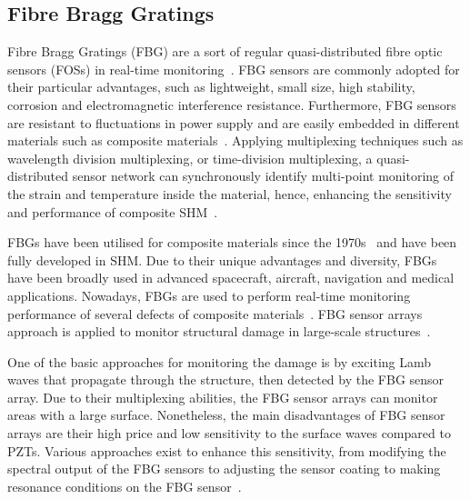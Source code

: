 \subsection{Fibre Bragg Gratings} 
Fibre Bragg Gratings (FBG) are a sort of regular quasi-distributed fibre optic sensors (FOSs) in real-time monitoring~\cite{Cai2012}.  
FBG sensors are commonly adopted for their particular advantages, such as lightweight, small size, high stability, corrosion and electromagnetic interference resistance. 
Furthermore, FBG sensors are resistant to fluctuations in power supply and are easily embedded in different materials such as composite materials~\cite{Jang2012}. 
Applying multiplexing techniques such as wavelength division multiplexing, or time-division multiplexing, a quasi-distributed sensor network can synchronously identify multi-point monitoring of the strain and temperature inside the material, hence, enhancing the sensitivity and performance of composite SHM~\cite{Jang2012}.

FBGs have been utilised for composite materials since the 1970s~\cite{othonos1999fiber} and have been fully developed in SHM. 
Due to their unique advantages and diversity, FBGs have been broadly used in advanced spacecraft, aircraft, navigation and medical applications. 
Nowadays, FBGs are used to perform real-time monitoring performance of several defects of composite materials~\cite{rezayat2016reconstruction}.
FBG sensor arrays approach is applied to monitor structural damage in large-scale structures~\cite{Wee2017}.

One of the basic approaches for monitoring the damage is by exciting Lamb waves that propagate through the structure, then detected by the FBG sensor array. 
Due to their multiplexing abilities, the FBG sensor arrays can monitor areas with a large surface. 
Nonetheless, the main disadvantages of FBG sensor arrays are their high price and low sensitivity to the surface waves compared to PZTs. 
Various approaches exist to enhance this sensitivity, from modifying the spectral output of the FBG sensors to adjusting the sensor coating to making resonance conditions on the FBG sensor~\cite{Wee2017}.
